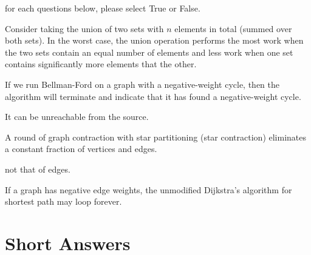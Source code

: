 \begin{problem}

for each questions below, please select True or False.

\asktf

Consider taking the union of two sets with $n$ elements in total
(summed over both sets).  In the worst case, the union operation
performs the most work when the two sets contain an equal number of
elements and less work when one set contains significantly more
elements that the other.

\solt



\asktf

If we run Bellman-Ford on a graph with a negative-weight cycle, then
the algorithm will terminate and indicate that it has found a
negative-weight cycle.

\solf
It can be unreachable from the source.


\asktf 

A round of graph contraction with star partitioning (star contraction)
eliminates a constant fraction of vertices and edges.

\solf
not that of edges.

\asktf

If a graph has negative edge weights, the unmodified Dijkstra's
algorithm for shortest path may loop forever.

\solf

\end{problem}


\section{Short Answers}

%

